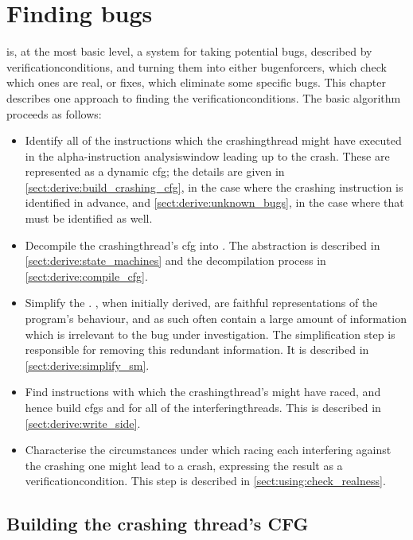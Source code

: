 \chapter{Finding bugs}
\label{sect:derive}

{\Technique} is, at the most basic level, a system for taking
potential bugs, described by \glspl{verificationcondition}, and
turning them into either \glspl{bugenforcer}, which check which ones
are real, or fixes, which eliminate some specific bugs.  This chapter
describes one approach to finding the \glspl{verificationcondition}.
The basic algorithm proceeds as follows:
\begin{itemize}
\item Identify all of the instructions which the \gls{crashingthread}
  might have executed in the \gls{alpha}-instruction
  \gls{analysiswindow} leading up to the crash.  These are represented
  as a \gls{dynamic cfg}; the details are given in
  \autoref{sect:derive:build_crashing_cfg}, in the case where the
  crashing instruction is identified in advance, and
  \autoref{sect:derive:unknown_bugs}, in the case where that must be
  identified as well.
\item Decompile the \gls{crashingthread}'s \gls{cfg} into
  {\AStateMachine}.  The {\StateMachine} abstraction is described in
  \autoref{sect:derive:state_machines} and the decompilation process
  in \autoref{sect:derive:compile_cfg}.
\item Simplify the {\StateMachine}.  {\STateMachines}, when initially
  derived, are faithful representations of the program's behaviour,
  and as such often contain a large amount of information which is
  irrelevant to the bug under investigation.  The simplification step
  is responsible for removing this redundant information.  It is
  described in \autoref{sect:derive:simplify_sm}.
\item Find instructions with which the \gls{crashingthread}'s
  {\StateMachine} might have raced, and hence build \glspl{cfg} and
  {\StateMachines} for all of the \glspl{interferingthread}.  This is
  described in \autoref{sect:derive:write_side}.
\item Characterise the circumstances under which racing each
  interfering {\StateMachine} against the crashing one might lead to a
  crash, expressing the result as a \gls{verificationcondition}.  This
  step is described in \autoref{sect:using:check_realness}.
\end{itemize}

\section{Building the crashing thread's CFG}
\label{sect:derive:build_crashing_cfg}

